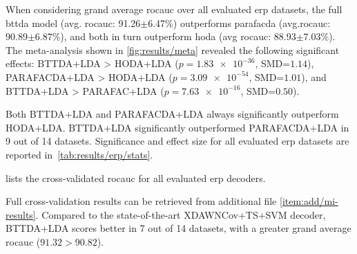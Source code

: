 \documentclass[twocolumn]{article}
\begin{document}
When considering grand average \ac{rocauc} over all evaluated \ac{erp} datasets,
the full \ac{bttda} model (avg. \ac{rocauc}: 91.26$\pm$6.47\%) outperforms \ac{parafacda}
(avg.\ac{rocauc}: 90.89$\pm$6.87\%),
and both in turn outperform \ac{hoda} (avg \ac{rocauc}: 88.93$\pm$7.03\%).
The meta-analysis shown in \cref{fig:results/meta} revealed the following
significant effects:
BTTDA+LDA > HODA+LDA ($p=\num{1.83e-36}$, SMD=$1.14$),
PARAFACDA+LDA > HODA+LDA ($p=\num{3.09e-54}$, SMD=$1.01$), and
BTTDA+LDA > PARAFAC+LDA ($p=\num{7.63e-16}$, SMD=$0.50$).
Both BTTDA+LDA and PARAFACDA+LDA always significantly outperform HODA+LDA.
BTTDA+LDA significantly outperformed PARAFACDA+LDA in 9 out of 14 datasets.
Significance and effect size for all evaluated \ac{erp} datasets are reported in~\cref{tab:results/erp/stats}.

 lists the cross-validated \ac{rocauc} for all evaluated
\ac{erp} decoders.
\begin{sidewaystable*}
	\footnotesize
	
	\caption{Area under the receiver operating characteristic curve for
		cross-validated within-session evaluation of HODA+LDA and our proposed decoders
		PARAFACDA+DLA and BTTDA+LDA evaluated on \ac{erp} datasets.
		Scores for other decoders were taken from \textcite{Chevallier2024}.
		BTTDA+LDA always outperforms HODA+LDA and PARAFACDA+LDA, except for datasets,
		and consistently is nearly on par with or outperforms
		the state-of-the-art XDAwnCov+TS+SVM decoder.
	}
	\label{tab:results/erp/score}
\end{sidewaystable*}
Full cross-validation results can be retrieved from additional file \cref{item:add/mi-results}.
Compared to the state-of-the-art XDAWNCov+TS+SVM decoder, BTTDA+LDA scores
better in 7 out of 14 datasets, with a greater grand average \ac{rocauc}
($91.32 > 90.82$).
\end{document}
